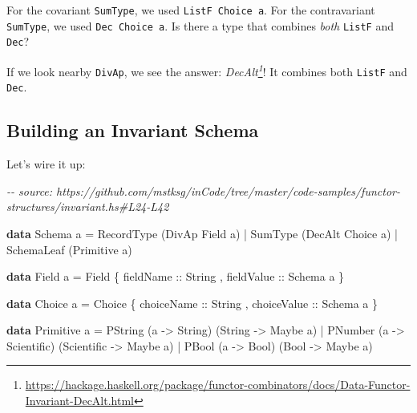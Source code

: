 \documentclass[]{article}
\newenvironment{Shaded}{}{}
\newcommand{\CommentTok}[1]{\textcolor[rgb]{0.38,0.63,0.69}{\textit{#1}}}
\newcommand{\DataTypeTok}[1]{\textcolor[rgb]{0.56,0.13,0.00}{#1}}
\newcommand{\KeywordTok}[1]{\textcolor[rgb]{0.00,0.44,0.13}{\textbf{#1}}}
\newcommand{\NormalTok}[1]{#1}
\newcommand{\OperatorTok}[1]{\textcolor[rgb]{0.40,0.40,0.40}{#1}}
\newcommand{\OtherTok}[1]{\textcolor[rgb]{0.00,0.44,0.13}{#1}}
\renewcommand{\href}[2]{#2\footnote{\url{#1}}}
\begin{document}
For the covariant \texttt{SumType}, we used \texttt{ListF\ Choice\ a}. For the
contravariant \texttt{SumType}, we used \texttt{Dec\ Choice\ a}. Is there a type
that combines \emph{both} \texttt{ListF} and \texttt{Dec}?

If we look nearby \texttt{DivAp}, we see the answer:
\emph{\href{https://hackage.haskell.org/package/functor-combinators/docs/Data-Functor-Invariant-DecAlt.html}{DecAlt}}!
It combines both \texttt{ListF} and \texttt{Dec}.

\hypertarget{building-an-invariant-schema}{%
\subsection{Building an Invariant Schema}\label{building-an-invariant-schema}}

Let's wire it up:

\begin{Shaded}
\begin{Highlighting}[]
\CommentTok{{-}{-} source: https://github.com/mstksg/inCode/tree/master/code{-}samples/functor{-}structures/invariant.hs\#L24{-}L42}

\KeywordTok{data} \DataTypeTok{Schema}\NormalTok{ a }\OtherTok{=}
      \DataTypeTok{RecordType}\NormalTok{  (}\DataTypeTok{DivAp}  \DataTypeTok{Field}\NormalTok{  a)}
    \OperatorTok{|} \DataTypeTok{SumType}\NormalTok{     (}\DataTypeTok{DecAlt} \DataTypeTok{Choice}\NormalTok{ a)}
    \OperatorTok{|} \DataTypeTok{SchemaLeaf}\NormalTok{  (}\DataTypeTok{Primitive}\NormalTok{ a)}

\KeywordTok{data} \DataTypeTok{Field}\NormalTok{ a }\OtherTok{=} \DataTypeTok{Field}
\NormalTok{    \{}\OtherTok{ fieldName  ::} \DataTypeTok{String}
\NormalTok{    ,}\OtherTok{ fieldValue ::} \DataTypeTok{Schema}\NormalTok{ a}
\NormalTok{    \}}

\KeywordTok{data} \DataTypeTok{Choice}\NormalTok{ a }\OtherTok{=} \DataTypeTok{Choice}
\NormalTok{    \{}\OtherTok{ choiceName  ::} \DataTypeTok{String}
\NormalTok{    ,}\OtherTok{ choiceValue ::} \DataTypeTok{Schema}\NormalTok{ a}
\NormalTok{    \}}

\KeywordTok{data} \DataTypeTok{Primitive}\NormalTok{ a }\OtherTok{=}
      \DataTypeTok{PString}\NormalTok{ (a }\OtherTok{{-}>} \DataTypeTok{String}\NormalTok{)     (}\DataTypeTok{String}     \OtherTok{{-}>} \DataTypeTok{Maybe}\NormalTok{ a)}
    \OperatorTok{|} \DataTypeTok{PNumber}\NormalTok{ (a }\OtherTok{{-}>} \DataTypeTok{Scientific}\NormalTok{) (}\DataTypeTok{Scientific} \OtherTok{{-}>} \DataTypeTok{Maybe}\NormalTok{ a)}
    \OperatorTok{|} \DataTypeTok{PBool}\NormalTok{   (a }\OtherTok{{-}>} \DataTypeTok{Bool}\NormalTok{)       (}\DataTypeTok{Bool}       \OtherTok{{-}>} \DataTypeTok{Maybe}\NormalTok{ a)}
\end{Highlighting}
\end{Shaded}
\end{document}
